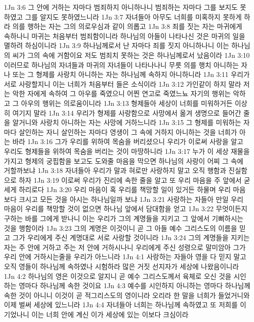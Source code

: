1Jn 3:6  그 안에 거하는 자마다 범죄하지 아니하나니 범죄하는 자마다 그를 보지도 못하였고 그를 알지도 못하였느니라
1Jn 3:7  자녀들아 아무도 너희를 미혹하지 못하게 하라 의를 행하는 자는 그의 의로우심과 같이 의롭고
1Jn 3:8  죄를 짓는 자는 마귀에게 속하나니 마귀는 처음부터 범죄함이니라 하나님의 아들이 나타나신 것은 마귀의 일을 멸하려 하심이니라
1Jn 3:9  하나님께로서 난 자마다 죄를 짓지 아니하나니 이는 하나님의 씨가 그의 속에 거함이요 저도 범죄치 못하는 것은 하나님께로서 났음이라
1Jn 3:10  이러므로 하나님의 자녀들과 마귀의 자녀들이 나타나나니 무릇 의를 행치 아니하는 자나 또는 그 형제를 사랑치 아니하는 자는 하나님께 속하지 아니하니라
1Jn 3:11  우리가 서로 사랑할지니 이는 너희가 처음부터 들은 소식이라
1Jn 3:12  가인같이 하지 말라 저는 악한 자에게 속하여 그 아우를 죽였으니 어찐 연고로 죽였느뇨 자기의 행위는 악하고 그 아우의 행위는 의로움이니라
1Jn 3:13  형제들아 세상이 너희를 미워하거든 이상히 여기지 말라
1Jn 3:14  우리가 형제를 사랑함으로 사망에서 옮겨 생명으로 들어간 줄을 알거니와 사랑치 아니하는 자는 사망에 거하느니라
1Jn 3:15  그 형제를 미워하는 자마다 살인하는 자니 살인하는 자마다 영생이 그 속에 거하지 아니하는 것을 너희가 아는 바라
1Jn 3:16  그가 우리를 위하여 목숨을 버리셨으니 우리가 이로써 사랑을 알고 우리도 형제들을 위하여 목숨을 버리는 것이 마땅하니라
1Jn 3:17  누가 이 세상 재물을 가지고 형제의 궁핍함을 보고도 도와줄 마음을 막으면 하나님의 사랑이 어찌 그 속에 거할까보냐
1Jn 3:18  자녀들아 우리가 말과 혀로만 사랑하지 말고 오직 행함과 진실함으로 하자
1Jn 3:19  이로써 우리가 진리에 속한 줄을 알고 또 우리 마음을 주 앞에서 굳세게 하리로다
1Jn 3:20  우리 마음이 혹 우리를 책망할 일이 있거든 하물며 우리 마음보다 크시고 모든 것을 아시는 하나님일까 보냐
1Jn 3:21  사랑하는 자들아 만일 우리 마음이 우리를 책망할 것이 없으면 하나님 앞에서 담대함을 얻고
1Jn 3:22  무엇이든지 구하는 바를 그에게 받나니 이는 우리가 그의 계명들을 지키고 그 앞에서 기뻐하시는 것을 행함이라
1Jn 3:23  그의 계명은 이것이니 곧 그 아들 예수 그리스도의 이름을 믿고 그가 우리에게 주신 계명대로 서로 사랑할 것이니라
1Jn 3:24  그의 계명들을 지키는 자는 주 안에 거하고 주는 저 안에 거하시나니 우리에게 주신 성령으로 말미암아 그가 우리 안에 거하시는줄을 우리가 아느니라
1Jn 4:1  사랑하는 자들아 영을 다 믿지 말고 오직 영들이 하나님께 속하였나 시험하라 많은 거짓 선지자가 세상에 나왔음이니라
1Jn 4:2  하나님의 영은 이것으로 알지니 곧 예수 그리스도께서 육체로 오신 것을 시인하는 영마다 하나님께 속한 것이요
1Jn 4:3  예수를 시인하지 아니하는 영마다 하나님께 속한 것이 아니니 이것이 곧 적그리스도의 영이니라 오리라 한 말을 너희가 들었거니와 이제 벌써 세상에 있느니라
1Jn 4:4  자녀들아 너희는 하나님께 속하였고 또 저희를 이기었나니 이는 너희 안에 계신 이가 세상에 있는 이보다 크심이라

